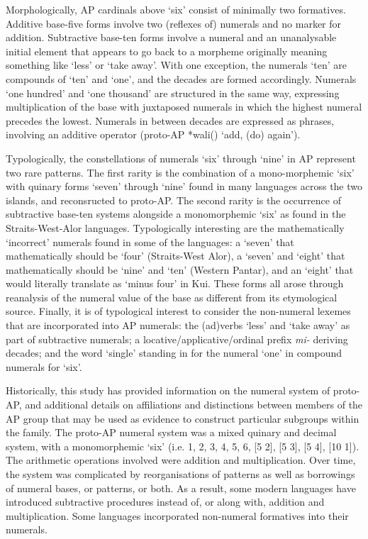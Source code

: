 Morphologically, AP cardinals above `six' consist of minimally two formatives. Additive base-five forms involve two (reflexes of) numerals and no marker for addition. Subtractive base-ten forms involve a numeral and an unanalysable initial element that appears to go back to a morpheme originally meaning something like `less' or `take away'. With one exception, the numerals `ten' are compounds of `ten' and `one', and the decades are formed accordingly. Numerals `one hundred' and `one thousand' are structured in the same way, expressing multiplication of the base with juxtaposed numerals in which the highest numeral precedes the lowest. Numerals in between decades are expressed as phrases, involving an additive operator (proto-AP *wali({\ng}) `add, (do) again'). 

Typologically, the constellations of numerals `six' through `nine' in AP represent two rare patterns. The first rarity is the combination of a mono-morphemic `six' with quinary forms `seven' through `nine' found in many languages across the two islands, and reconsructed to proto-AP. The second rarity is the occurrence of subtractive base-ten systems alongside a monomorphemic `six' as found in the Straits-West-Alor languages. Typologically interesting are the mathematically `incorrect' numerals found in some of the languages: a `seven' that mathematically should be `four' (Straits-West Alor), a `seven' and `eight' that mathematically should be `nine' and `ten' (Western Pantar), and an `eight' that would literally translate as `minus four' in Kui. These forms all arose through reanalysis of the numeral value of the base as different from its etymological source. Finally, it is of typological interest to consider the non-numeral lexemes that are incorporated into AP numerals: the (ad)verbs `less' and `take away' as part of subtractive numerals; a locative/applicative/ordinal prefix \textit{mi-} deriving decades; and the word `single' standing in for the numeral `one' in compound numerals for `six'. 

Historically, this study has provided information on the numeral system of proto-AP, and additional details on affiliations and distinctions between members of the AP group that may be used as evidence to construct particular subgroups within the family. The proto-AP numeral system was a mixed quinary and decimal system, with a monomorphemic `six' (i.e. 1, 2, 3, 4, 5, 6, [5 2], [5 3], [5 4], [10 1]). The arithmetic operations involved were addition and multiplication. Over time, the system was complicated by reorganisations of patterns as well as borrowings of numeral bases, or patterns, or both. As a result, some modern languages have introduced subtractive procedures instead of, or along with, addition and multiplication. Some languages incorporated non-numeral formatives into their numerals. 

